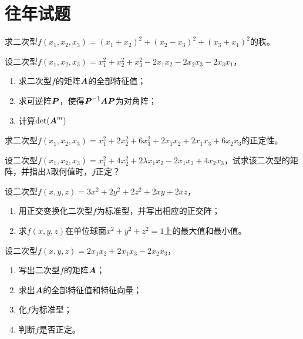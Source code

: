 \section{往年试题}

\begin{frame}
  \begin{li}[05-06上]
    求二次型$f(x_1,x_2,x_3)=(x_1+x_2)^2+(x_2-x_3)^2+(x_3+x_1)^2$的秩。
  \end{li}
\end{frame}

\begin{frame}
  \begin{li}[05-06上]
    设二次型$f(x_1,x_2,x_3)=x_1^2+x_2^2+x_3^2-2x_1x_2-2x_2x_3-2x_3x_1$，
    \begin{enumerate}
    \item 求二次型$f$的矩阵$\boldsymbol{A}$的全部特征值；
    \item 求可逆阵$\boldsymbol{P}$，使得$\boldsymbol{P}^{-1}\boldsymbol{A}\boldsymbol{P}$为对角阵；
    \item 计算$\mathrm{det}(\boldsymbol{A}^m)$
    \end{enumerate}
  \end{li}
\end{frame}

\begin{frame}
  \begin{li}[05-06下]
    求二次型$f(x_1,x_2,x_3)=x_1^2+2x_2^2+6x_3^2+2x_1x_2+2x_1x_3+6x_2x_3$的正定性。
  \end{li}
\end{frame}

\begin{frame}
  \begin{li}[06-07上]
    设二次型$f(x_1,x_2,x_3)=x_1^2+4x_2^2+2\lambda x_1x_2-2x_1x_3+4x_2x_3$，试求该二次型的矩阵，并指出$\lambda$取何值时，$f$正定？
  \end{li}
\end{frame}

\begin{frame}
  \begin{li}[06-07下]
    设二次型$f(x,y,z)=3x^2+2y^2+2z^2+2xy+2xz$，
    \begin{enumerate}
    \item 用正交变换化二次型$f$为标准型，并写出相应的正交阵；
    \item 求$f(x,y,z)$在单位球面$x^2+y^2+z^2=1$上的最大值和最小值。
    \end{enumerate}
  \end{li}
\end{frame}

\begin{frame}
  \begin{li}[06-07下]
    设二次型$f(x,y,z)=2x_1x_2+2x_1x_3-2x_2x_3$，
    \begin{enumerate}
    \item 写出二次型$f$的矩阵$\boldsymbol{A}$；
    \item 求出$\boldsymbol{A}$的全部特征值和特征向量；
    \item 化$f$为标准型；
    \item 判断$f$是否正定。
    \end{enumerate}
  \end{li}
\end{frame}